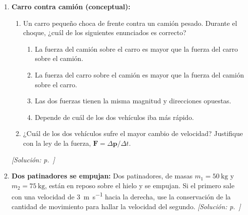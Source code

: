 \documentclass[11pt,a4paper]{book}
\begin{document}
\begin{enumerate}[label=\textbf{P\arabic*.}, ref=P\arabic*, leftmargin=*]
    \item\label{prob:parcial2-camion} \textbf{Carro contra camión
    (conceptual):}
    \begin{enumerate}[label=(\Roman*)]
        \item Un carro pequeño choca de frente contra un camión pesado.
        Durante el choque, ¿cuál de los siguientes enunciados es correcto?
        \begin{enumerate}[label=\alph*)]
            \item La fuerza del camión sobre el carro es mayor que la fuerza
            del carro sobre el camión.
            \item La fuerza del carro sobre el camión es mayor que la fuerza
            del camión sobre el carro.
            \item Las dos fuerzas tienen la misma magnitud y direcciones
            opuestas.
            \item Depende de cuál de los dos vehículos iba más rápido.
        \end{enumerate}
        \item ¿Cuál de los dos vehículos sufre el mayor cambio de velocidad?
        Justifique con la ley de la fuerza,
        $\boldsymbol{F} = \Delta\boldsymbol{p}/\Delta t$.
    \end{enumerate}
    \hfill\textit{[Solución: p.~\pageref{sol:parcial2-camion}]}

    \item\label{prob:parcial2-patinadores} \textbf{Dos patinadores se
    empujan:} Dos patinadores, de masas $m_1 = \SI{50}{\kilogram}$ y
    $m_2 = \SI{75}{\kilogram}$, están en reposo sobre el hielo y se empujan.
    Si el primero sale con una velocidad de \SI{3}{\meter\per\second} hacia
    la derecha, use la conservación de la cantidad de movimiento para hallar
    la velocidad del segundo.
    \hfill\textit{[Solución: p.~\pageref{sol:parcial2-patinadores}]}


\end{enumerate}
\end{document}
